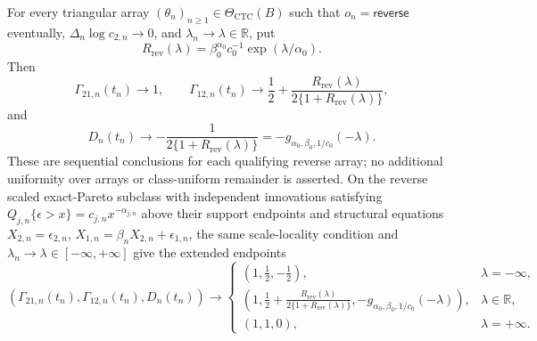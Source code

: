 For every triangular array \((\theta_n)_{n\geq1}\in\Theta_{\mathrm{CTC}}(B)\) such that \(o_n=\mathsf{reverse}\) eventually, \(\Delta_n\log c_{2,n}\to0\), and \(\lambda_n\to\lambda\in\mathbb R\), put
\[
R_{\mathrm{rev}}(\lambda)=\beta_0^{\alpha_0}c_0^{-1}\exp(\lambda/\alpha_0).
\]
Then
\[
\Gamma_{21,n}(t_n)\to1,
\qquad
\Gamma_{12,n}(t_n)\to\frac12+\frac{R_{\mathrm{rev}}(\lambda)}{2\{1+R_{\mathrm{rev}}(\lambda)\}},
\]
and
\[
D_n(t_n)\to-\frac1{2\{1+R_{\mathrm{rev}}(\lambda)\}}
=-g_{\alpha_0,\beta_0,1/c_0}(-\lambda).
\]
These are sequential conclusions for each qualifying reverse array; no additional uniformity over arrays or class-uniform remainder is asserted. On the reverse scaled exact-Pareto subclass with independent innovations satisfying \(Q_{j,n}\{\epsilon>x\}=c_{j,n}x^{-\alpha_{j,n}}\) above their support endpoints and structural equations \(X_{2,n}=\epsilon_{2,n}\), \(X_{1,n}=\beta_nX_{2,n}+\epsilon_{1,n}\), the same scale-locality condition and \(\lambda_n\to\lambda\in[-\infty,+\infty]\) give the extended endpoints
\[
(\Gamma_{21,n}(t_n),\Gamma_{12,n}(t_n),D_n(t_n))\longrightarrow
\begin{cases}
(1,\frac12,-\frac12), & \lambda=-\infty,\\
\left(1,\frac12+\frac{R_{\mathrm{rev}}(\lambda)}{2\{1+R_{\mathrm{rev}}(\lambda)\}},-g_{\alpha_0,\beta_0,1/c_0}(-\lambda)\right), & \lambda\in\mathbb R,\\
(1,1,0), & \lambda=+\infty.
\end{cases}
\]